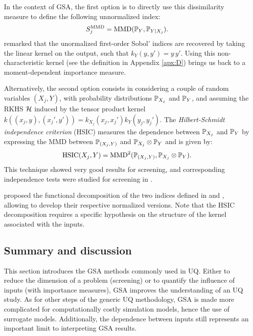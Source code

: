 In the context of GSA, the first option is to directly use this dissimilarity measure to define the following unnormalized index: 
\begin{equation}
    S_j^{\MMD} = \MMD(\P_Y, \P_{Y |X_j}). 
    \label{eq:mmd_gsa}
\end{equation}
\citet{daveiga_2021_kernel_ANOVA} remarked that the unormalized first-order Sobol' indices are recovered by taking the linear kernel on the output, such that $k_{Y}(y, y')=y\, y'$. 
Using this non-characteristic kernel (see the definition in Appendix \ref{apx:D}) brings us back to a moment-dependent importance measure. 

Alternatively, the second option consists in considering a couple of random variables $(X_j, Y)$, with probability distributions $\P_{X_j}$ and $\P_Y$, and assuming the RKHS $\iH$  
induced by the tensor product kernel $k((x_j, y), (x_j', y')) = k_{X_j}(x_j, x_j') k_{Y}(y_j, y_j')$. 
The \textit{Hilbert-Schmidt independence criterion} (HSIC) measures the dependence between $\P_{X_j}$ and $\P_Y$ by expressing the MMD between $\P_{(X_j, Y)}$ and $\P_{X_j} \otimes \P_{Y}$ and is given by: 
\begin{equation}
    \mathrm{HSIC}(X_j, Y) = \MMD^2(\P_{(X_j, Y)}, \P_{X_j} \otimes \P_{Y}).
    \label{eq:hsic}
\end{equation}
This technique showed very good results for screening, and corresponding independence tests were studied for screening in \citet{delozzo_2016_hsic_test}. 

\citet{daveiga_2021_kernel_ANOVA} proposed the functional decomposition of the two indices defined in  and , allowing to develop their respective normalized versions. 
Note that the HSIC decomposition requires a specific hypothesis on the structure of the kernel associated with the inputs. 



\subsection{Summary and discussion}

This section introduces the GSA methods commonly used in UQ. 
Either to reduce the dimension of a problem (screening) or to quantify the influence of inputs (with importance measures), GSA improves the understanding of an UQ study.   
As for other steps of the generic UQ methodology, GSA is made more complicated for computationally costly simulation models, hence the use of surrogate models. 
Additionally, the dependence between inputs still represents an important limit to interpreting GSA results. 

